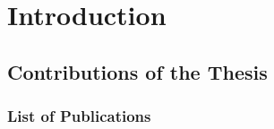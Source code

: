 \documentclass[a4paper,11pt,twoside]{StyleThese}
\begin{document}
\fi


\chapter*{Introduction}





\section*{Contributions of the Thesis}


\subsection*{List of Publications}
\end{document}
